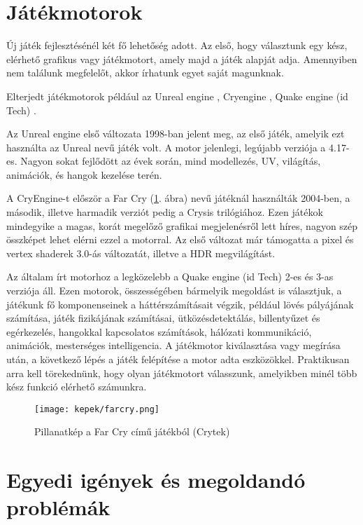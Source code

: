 \label{Chap:problemakor}

\section{Játékmotorok}

Új játék fejlesztésénél két fő lehetőség adott. Az első, hogy választunk egy kész, elérhető grafikus vagy játékmotort, amely majd a játék alapját adja. Amennyiben nem találunk megfelelőt, akkor írhatunk egyet saját magunknak.

Elterjedt játékmotorok például az Unreal engine \cite{Unreal}, Cryengine \cite{CryEngine}, Quake engine (id Tech) \cite{IdTech}.

Az Unreal engine első változata 1998-ban jelent meg, az első játék, amelyik ezt használta az Unreal nevű játék volt. A motor jelenlegi, legújabb verziója a 4.17-es. Nagyon sokat fejlődött az évek során, mind modellezés, UV, világítás, animációk, és hangok kezelése terén.

A CryEngine-t először a Far Cry (\ref{fig:farcry}. ábra) nevű játéknál használták 2004-ben, a második, illetve harmadik verziót pedig a Crysis trilógiához. Ezen játékok mindegyike a magas, korát megelőző grafikai megjelenésről lett híres, nagyon szép összképet lehet elérni ezzel a motorral. Az első változat már támogatta a pixel és vertex shaderek 3.0-ás változatát, illetve a HDR megvilágítást.

Az általam írt motorhoz a legközelebb a Quake engine (id Tech) 2-es és 3-as verziója áll. Ezen motorok, összességében bármelyik megoldást is választjuk, a játékunk fő komponenseinek a háttérszámításait végzik, például lövés pályájának számítása, játék fizikájának számításai, ütközésdetektálás, billentyűzet és egérkezelés, hangokkal kapcsolatos számítások, hálózati kommunikáció, animációk, mesterséges intelligencia. A játékmotor kiválasztása vagy megírása után, a következő lépés a játék felépítése a motor adta eszközökkel. Praktikusan arra kell törekednünk, hogy olyan játékmotort válasszunk, amelyikben minél több kész funkció elérhető számunkra.

\begin{figure}[h]
\centering
\texttt{[image: kepek/farcry.png]}
\caption{Pillanatkép a Far Cry című játékból (Crytek)}
\label{fig:farcry}
\end{figure}

\section{Egyedi igények és megoldandó problémák}

